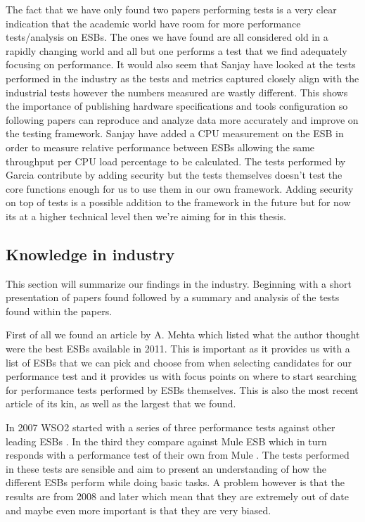 The fact that we have only found two papers \cite{Sanjay2011,Garcia2010} performing tests is a very clear indication that the academic world have room for more performance tests/analysis on ESBs. The ones we have found are all considered old in a rapidly changing world and all but one \cite{Sanjay2011} performs a test that we find adequately focusing on performance. 
It would also seem that Sanjay \cite{Sanjay2011} have looked at the tests performed in the industry \cite{Perera07,Perera07R2,Perera07R3,mulesoft08} as the tests and metrics captured closely align with the industrial tests however the numbers measured are wastly different. 
This shows the importance of publishing hardware specifications and tools configuration so following papers can reproduce and analyze data more accurately and improve on the testing framework.
Sanjay have added a CPU measurement on the ESB in order to measure relative performance between ESBs allowing the same throughput per CPU load percentage to be calculated.
The tests performed by Garcia \cite{Garcia2010} contribute by adding security but the tests themselves doesn't test the core functions enough for us to use them in our own framework. 
Adding security on top of tests is a possible addition to the framework in the future but for now its at a higher technical level then we're aiming for in this thesis.


\subsection{Knowledge in industry}
\label{sec:industry_section}
This section will summarize our findings in the industry. Beginning with a short presentation of papers found followed by a summary and analysis of the tests found within the papers.


First of all we found an article by A. Mehta \cite{mehta11} which listed what the author thought were the best ESBs available in 2011. This is important as it provides us with a list of ESBs that we can pick and choose from when selecting candidates for our performance test and it provides us with focus points on where to start searching for performance tests performed by ESBs themselves. This is also the most recent article of its kin, as well as the largest that we found.


In 2007 WSO2 started with a series of three performance tests against other leading ESBs \cite{Perera07,Perera07R2,Perera07R3}. In the third they compare against Mule ESB which in turn responds with a performance test of their own from Mule \cite{mulesoft08}. The tests performed in these tests are sensible and aim to present an understanding of how the different ESBs perform while doing basic tasks. A problem however is that the results are from 2008 and later which mean that they are extremely out of date and maybe even more important is that they are very biased.


